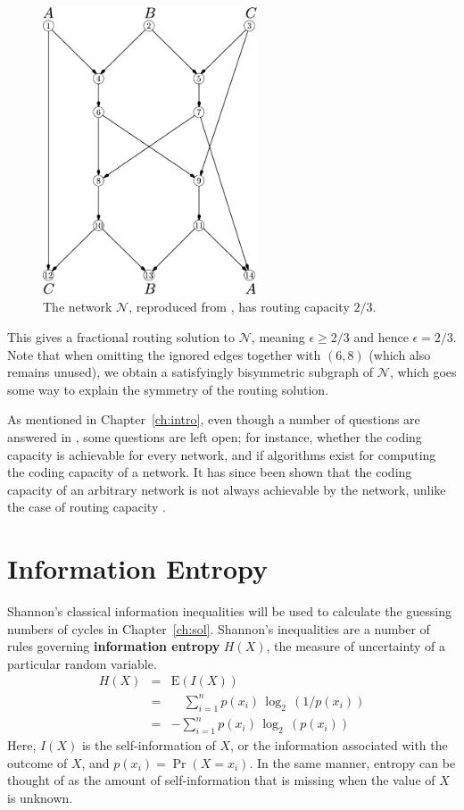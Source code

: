 \begin{figure}[ht]
	\centering
	\includegraphics[width=180pt]{figures/routing.pdf}
	\caption[Routing capacity of the network $\mathcal{N}$]{The network $\mathcal{N}$, reproduced from \cite{cann2006}, has routing capacity $2/3$.}
	\label{routing}
\end{figure}

This gives a fractional routing solution to $\mathcal{N}$, meaning $\epsilon \geq 2/3$ and hence $\epsilon = 2/3$. Note that when omitting the ignored edges together with $(6, 8)$ (which also remains unused), we obtain a satisfyingly bisymmetric subgraph of $\mathcal{N}$, which goes some way to explain the symmetry of the routing solution.

As mentioned in Chapter~\ref{ch:intro}, even though a number of questions are answered in \cite{cann2006}, some questions are left open; for instance, whether the coding capacity is achievable for every network, and if algorithms exist for computing the coding capacity of a network. It has since been shown that the coding capacity of an arbitrary network is not always achievable by the network, unlike the case of routing capacity \cite{doug2006}.

\section{Information Entropy}
\label{sect:entropy}

Shannon's classical information inequalities \cite{shan1948} will be used to calculate the guessing numbers of cycles in Chapter~\ref{ch:sol}. Shannon's inequalities are a number of rules governing \textbf{information entropy} $H(X)$, the measure of uncertainty of a particular random variable.
\begin{eqnarray*}
  	H(X) & = & \mathrm{E}(I(X)) \\
	       & = & \quad \sum_{i = 1}^n p(x_i) \, \log_2 \, ( 1 / p(x_i)) \\
	       & = & - \sum_{i = 1}^n p(x_i) \, \log_2 \, (p(x_i))
\end{eqnarray*}
Here, $I(X)$ is the self-information of $X$, or the information associated with the outcome of $X$, and $p(x_i) = \Pr(X \! = \! x_i)$. In the same manner, entropy can be thought of as the amount of self-information that is missing when the value of $X$ is unknown.

